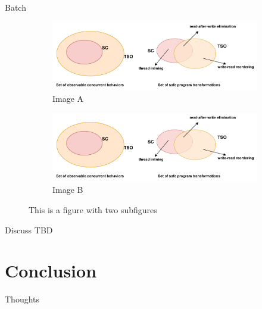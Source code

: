 \documentclass[notes, xcolor=dvipsnames]{beamer}
\begin{document}
    \begin{frame}{Batch}

        \begin{figure}
            \begin{subfigure}[h]{0.4\linewidth}
                \includegraphics[width=\linewidth]{sample.pdf}
                \caption{Image A}
            \end{subfigure}
                \hfill
                \begin{subfigure}[h]{0.4\linewidth}
                \includegraphics[width=\linewidth]{sample.pdf}
                \caption{Image B}
            \end{subfigure}%
            \caption{This is a figure with two subfigures}
        \end{figure}

    \end{frame}

    \begin{frame}{Discuss}
        TBD
    \end{frame}


    \section{Conclusion}

    \begin{frame}{Thoughts}


    \end{frame}

    \begin{frame} 

    \end{frame}
\end{document}
